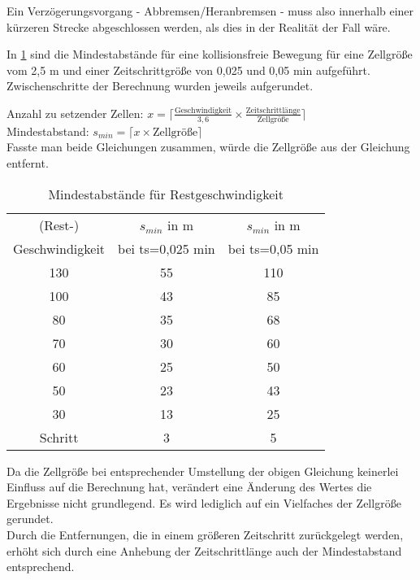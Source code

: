 Ein Verzögerungsvorgang - Abbremsen/Heranbremsen - muss also innerhalb einer kürzeren Strecke abgeschlossen werden, als dies in der Realität der Fall wäre.

In \cref{tab:restgeschw-abstand} sind die Mindestabstände für eine kollisionsfreie Bewegung für eine Zellgröße vom 2,5 m und einer Zeitschrittgröße von 0,025 und 0,05 min aufgeführt.
Zwischenschritte der Berechnung wurden jeweils aufgerundet.

\noindent
Anzahl zu setzender Zellen: $ x = \lceil \frac{\text{Geschwindigkeit}}{3,6} \times \frac{\text{Zeitschrittlänge}}{\text{Zellgröße}} \rceil $
\\
Mindestabstand: $ s_{min} = \lceil x \times \text{Zellgröße} \rceil $
\\
Fasste man beide Gleichungen zusammen, würde die Zellgröße aus der Gleichung entfernt.

\begin{table}[ht]
\begin{center}
\setlength{\tabcolsep}{0.5em} %
{\renewcommand{\arraystretch}{1.2}%
\begin{tabular}{| c  c  c |}
\hline 
(Rest-) & $ s_{min} $ in m & $ s_{min} $ in m  \\ 
Geschwindigkeit & bei ts=0,025 min & bei ts=0,05 min \\ \hline 
130 & 55 & 110 \\ 
100 & 43 & 85 \\ 
80 & 35 & 68 \\ 
70 & 30 & 60 \\ 
60 & 25 & 50 \\ 
50 & 23 & 43 \\ 
30 & 13 & 25 \\ 
Schritt & 3 & 5 \\ \hline
\end{tabular}
}
\caption{Mindestabstände für Restgeschwindigkeit}
\label{tab:restgeschw-abstand}
\end{center}
\end{table}

Da die Zellgröße bei entsprechender Umstellung der obigen Gleichung keinerlei Einfluss auf die Berechnung hat, verändert eine Änderung des Wertes die Ergebnisse nicht grundlegend. 
Es wird lediglich auf ein Vielfaches der Zellgröße gerundet.
\\
Durch die Entfernungen, die in einem größeren Zeitschritt zurückgelegt werden, erhöht sich durch eine Anhebung der Zeitschrittlänge auch der Mindestabstand entsprechend.












